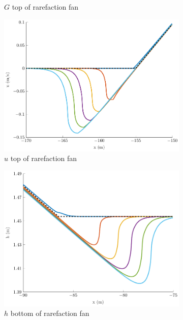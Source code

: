 \documentclass[10pt]{elsarticle}
\begin{document}
\begin{figure}
\begin{subfigure}{0.32\textwidth}
		\caption{$G$ top of rarefaction fan}
	\end{subfigure}
	\begin{subfigure}{0.32\textwidth}
		\centering
		\includegraphics[width=\textwidth]{./Figures/Simulations/Study/RegSWWE/Convergence/uRFtop.pdf}
		\caption{$u$ top of rarefaction fan}
	\end{subfigure}
	\begin{subfigure}{0.32\textwidth}
		\centering
		\includegraphics[width=\textwidth]{./Figures/Simulations/Study/RegSWWE/Convergence/hRFBot.pdf}
		\caption{$h$ bottom of rarefaction fan}
	\end{subfigure}
	\begin{subfigure}{0.32\textwidth}

\end{subfigure}
\end{figure}
\end{document}
